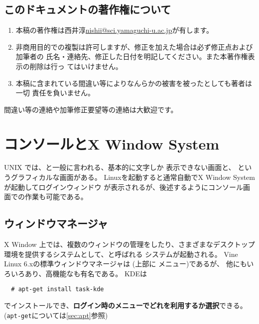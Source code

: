 \documentclass{jreport}
\begin{document}
\section*{このドキュメントの著作権について}

\begin{enumerate}
\item 本稿の著作権は西井淳\url{nishii@sci.yamaguchi-u.ac.jp}が有します。
\item 非商用目的での複製は許可しますが、修正を加えた場合は必ず修正点および加筆者の
氏名・連絡先、修正した日付を明記してください。また本著作権表示の削除は行っ
てはいけません。
\item 本稿に含まれている間違い等によりなんらかの被害を被ったとしても著者は一切
責任を負いません。
\end{enumerate}
間違い等の連絡や加筆修正要望等の連絡は大歓迎です。

\chapter{コンソールとX Window System}

UNIX では、と一般に言われる、基本的に文字しか
表示できない画面と、 というグラフィカルな画面がある。
Linuxを起動すると通常自動でX Window Systemが起動してログインウィンドウ
が表示されるが、後述するようにコンソール画面での作業も可能である。


\section{ウィンドウマネージャ}

X Window 上では、複数のウィンドウの管理をしたり、さまざまなデスクトップ
環境を提供するシステムとして、と呼ばれる
システムが起動される。
Vine Linux 6.xの標準ウィンドウマネージャは  (上部に
メニュー)であるが、
他にもいろいろあり、高機能なも有名である。
KDEは
\begin{verbatim}
  # apt-get install task-kde
\end{verbatim}
でインストールでき、\textbf{ログイン時のメニューでどれを利用するか選択}できる。
(\verb|apt-get|については\ref{sec:apt}参照)
\end{document}
